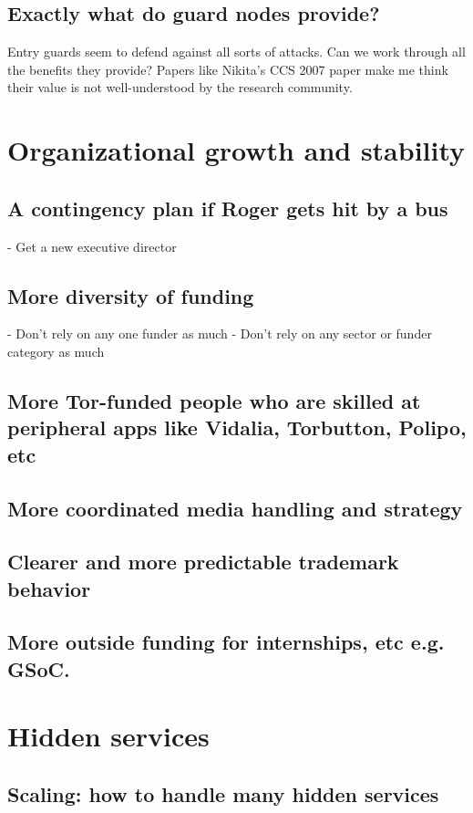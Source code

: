 \documentclass{article}
\begin{document}
\subsection{Exactly what do guard nodes provide?}

Entry guards seem to defend against all sorts of attacks. Can we work
through all the benefits they provide? Papers like Nikita's CCS 2007
paper make me think their value is not well-understood by the research
community.

\section{Organizational growth and stability}
\subsection{A contingency plan if Roger gets hit by a bus}
      - Get a new executive director
\subsection{More diversity of funding}
      - Don't rely on any one funder as much
      - Don't rely on any sector or funder category as much
\subsection{More Tor-funded people who are skilled at peripheral apps like
      Vidalia, Torbutton, Polipo, etc}
\subsection{More coordinated media handling and strategy}
\subsection{Clearer and more predictable trademark behavior}
\subsection{More outside funding for internships, etc e.g. GSoC.}
\section{Hidden services}
\subsection{Scaling: how to handle many hidden services}
\end{document}
